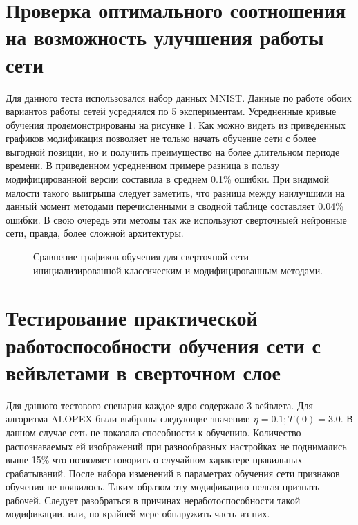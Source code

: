 \documentclass[utf8,usehyperref,14pt]{G7-32}
\begin{document}
\section{Проверка оптимального соотношения на возможность улучшения работы сети}
Для данного теста использовался набор данных MNIST. Данные по работе обоих вариантов работы сетей усреднялся по 5 экспериментам. Усредненные кривые обучения продемонстрированы на рисунке \ref{it_works}. Как можно видеть из приведенных графиков модификация позволяет не только начать обучение сети с более выгодной позиции, но и получить преимущество на более длительном периоде времени. В приведенном усредненном примере разница в пользу модифицированной версии составила в среднем 0.1\% ошибки. При видимой малости такого выигрыша следует заметить, что разница между наилучшими на данный момент методами перечисленными в сводной таблице составляет 0.04\% ошибки. В свою очередь эти методы так же используют сверточныей нейронные сети, правда, более сложной архитектуры.
\begin{figure}[H]
  \caption{Сравнение графиков обучения для сверточной сети инициализированной классическим и модифицированным методами.}\label{it_works}
\end{figure}

\section{Тестирование практической работоспособности обучения сети с вейвлетами в сверточном слое}
Для данного тестового сценария каждое ядро содержало 3 вейвлета. Для алгоритма ALOPEX были выбраны следующие значения: $ \eta = 0.1; T(0) = 3.0 $. В данном случае сеть не показала способности к обучению. Количество распознаваемых ей изображений при разнообразных настройках не поднимались выше 15\% что позволяет говорить о случайном характере правильных срабатываний. После набора изменений в параметрах обучения сети признаков обучения не появилось. Таким образом эту модификацию нельзя признать рабочей. Следует разобраться в причинах неработоспособности такой модификации, или, по крайней мере обнаружить часть из них.
\end{document}
